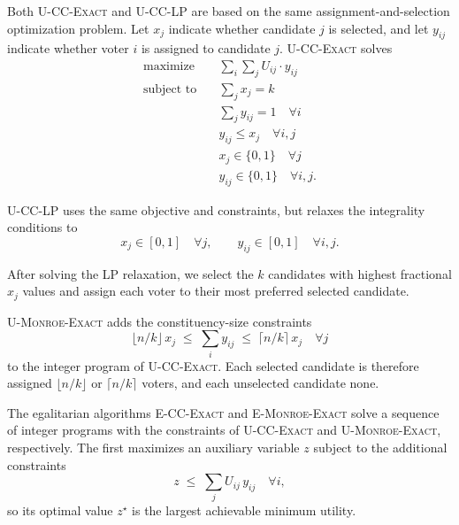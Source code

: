\documentclass[letterpaper]{article} %
\newcommand{\Exact}{\textsc{U-CC-Exact}}
\newcommand{\LP}{\textsc{U-CC-LP}}
\newcommand{\ExactMonroe}{\textsc{U-Monroe-Exact}}
\newcommand{\EExactMonroe}{\textsc{E-Monroe-Exact}}
\newcommand{\ECCExact}{\textsc{E-CC-Exact}}
\begin{document}
Both \Exact{} and \LP{} are based on the same assignment-and-selection optimization problem.
Let \(x_j\) indicate whether candidate \(j\) is selected, and let \(y_{ij}\) indicate whether voter \(i\) is assigned to candidate \(j\).
\Exact{} solves
\[
\begin{aligned}
\text{maximize} \quad & \sum_i \sum_j U_{ij}\cdot y_{ij} \\
\text{subject to} \quad
& \sum_j x_j = k \\
& \sum_j y_{ij} = 1 \quad \forall i \\
& y_{ij} \le x_j \quad \forall i,j \\
& x_j \in \{0,1\} \quad \forall j \\
& y_{ij} \in \{0,1\} \quad \forall i,j.
\end{aligned}
\]

\LP{} uses the same objective and constraints, but relaxes the integrality conditions to
\[
x_j \in [0,1] \quad \forall j,
\qquad
y_{ij} \in [0,1] \quad \forall i,j.
\]

After solving the LP relaxation, we select the \(k\) candidates with highest fractional \(x_j\) values and assign each voter to their most preferred selected candidate.

\ExactMonroe{} adds the constituency-size constraints
\[
\lfloor n/k\rfloor\, x_j \;\le\; \sum_i y_{ij} \;\le\; \lceil n/k\rceil\, x_j \quad \forall j
\]
to the integer program of \Exact{}.
Each selected candidate is therefore assigned \(\lfloor n/k\rfloor\) or \(\lceil n/k\rceil\) voters, and each unselected candidate none.

The egalitarian algorithms \ECCExact{} and \EExactMonroe{} solve a sequence of integer programs with the constraints of \Exact{} and \ExactMonroe{}, respectively.
The first maximizes an auxiliary variable \(z\) subject to the additional constraints
\[
z \;\le\; \sum_j U_{ij}\, y_{ij} \quad \forall i,
\]
so its optimal value \(z^\star\) is the largest achievable minimum utility.
\end{document}
